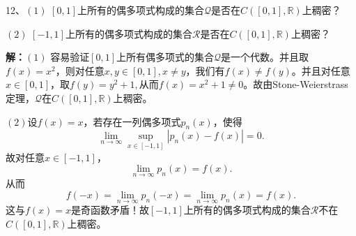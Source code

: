 \documentclass[12pt,fancyhdr,UTF8,openany]{ctexart}
\begin{document}
\vspace{2em}
12、$(1)$ $\left[0,1\right]$上所有的偶多项式构成的集合$\mathcal{Q}$是否在$C(\left[0,1\right],\mathbb{R} )$上稠密？\par 
$(2)$ $\left[-1,1\right]$上所有的偶多项式构成的集合$\mathcal{R}$是否在$C(\left[0,1\right],\mathbb{R})$上稠密？\par 
\textbf{解：}$(1)$ 容易验证$[0,1]$上所有偶多项式的集合$\mathcal{Q}$是一个代数。并且取$f(x)=x^2$，则对任意$x,y\in[0,1],x\not= y$，我们有$f(x)\not=f(y)$。并且对任意$x\in[0,1]$，取$f(y)=y^2+1,$从而$f(x)=x^2+1\not=0$。故由Stone-Weierstrass定理，$\mathcal{Q}$在$C([0,1],\mathbb{R})$上稠密。\par 
$(2)$设$f(x)=x$，若存在一列偶多项式$p_n(x)$，使得
\[\lim\limits_{n\rightarrow \infty} \sup_{x\in[-1,1]}|p_n(x)-f(x)|=0.\]
故对任意$x\in [-1,1]$，
\[\lim\limits_{n\rightarrow \infty}p_n(x)=f(x).\]
从而
\[f(-x)=\lim\limits_{n\rightarrow \infty}p_n(-x)=\lim\limits_{n\rightarrow \infty}p_n(x)=f(x).\]
这与$f(x)=x$是奇函数矛盾！故$\left[-1,1\right]$上所有的偶多项式构成的集合$\mathcal{R}$不在$C(\left[0,1\right],\mathbb{R})$上稠密。
\end{document}
